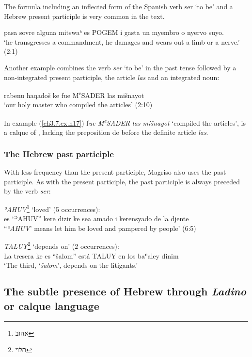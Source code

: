 \documentclass[output=paper,colorlinks,citecolor=brown,babel,arabicfont]{langscibook}
\begin{document}
The formula including an inflected form of the Spanish verb ser ‘to be’ and a Hebrew present participle is very common in the text.

\ea\label{ch3.7.ex.n16}
{pasa sovre} alguna mitswaʰ es POGEM i gasta un myembro o nyervo suyo. \\
`he transgresses a commandment, he damages and wears out a limb or a nerve.' (2:1)
\z

Another example combines the verb \textit{ser} `to be' in the past tense followed by a non-integrated  present participle, the  article \textit{las} and an integrated  noun:

\ea\label{ch3.7.ex.n17}
rabenu haqadoš ke fue M\textsuperscript{e}SADER las mišnayot \\
`our holy master who compiled the articles' (2:10)
\z

In example (\ref{ch3.7.ex.n17}) f\textit{ue M\textsuperscript{e}SADER las mišnayot} `compiled the articles', is a calque of , lacking the preposition de before the definite article \textit{las}.

\subsubsection{The Hebrew past participle}\label{ch3.7.ss.3.2.5}

With less frequency than the present participle, Magriso also uses the  past participle. As with the present participle, the past participle is always preceded by the verb \textit{ser}: 

\ea\label{ch3.7.ex.n18}
\textit{ʾAHUV}\footnote{\texthebrew{אהוב}} `loved' (5 occurrences): \\
es ``ʾAHUV'' kere dizir ke sea amado i kerensyado de la djente \\
``\textit{ʾAHUV}' means let him be loved and pampered by people' (6:5)
\z

\ea\label{ch3.7.ex.n19}
\textit{TALUY}\footnote{\texthebrew{תלוי}} `depends on' (2 occurrences): \\
La tresera ke es ``šalom'' está TALUY en los baʿaley dinim \\
`The third, `\textit{šalom}', depends on the litigants.'
\z

\subsection{The subtle presence of Hebrew through \textit{Ladino} or calque language}\label{ch3.7.ss.3.3}
\end{document}
